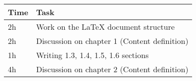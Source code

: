 \begin{center}
    {\renewcommand{\arraystretch}{2}%
    \begin{tabular}{L{2cm}L{12cm}}
        \hline
        \textbf{Time} & \textbf{Task} \\
        \hline
        2h & Work on the LaTeX document structure \\
        \hline
        2h & Discussion on chapter 1 (Content definition) \\
        \hline
        1h & Writing 1.3, 1.4, 1.5, 1.6 sections \\
        \hline
        4h & Discussion on chapter 2 (Content definition) \\
        \hline
    \end{tabular}}
\end{center}